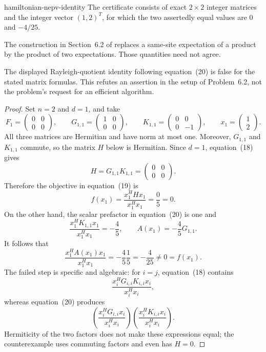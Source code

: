 \begin{cxcertificate}{hamiltonian-nepv-identity}
The certificate consists of exact $2\times2$ integer matrices and the integer
vector $(1,2)^T$, for which the two assertedly equal values are $0$ and
$-4/25$.
\end{cxcertificate}

\begin{cxrefutation}
The construction in Section~6.2 of \cite{AmselEtAl2026} replaces a same-site
expectation of a product by the product of two expectations.  Those
quantities need not agree.

\begin{theorem}
\label{thm:hamiltonian-nepv-identity}
The displayed Rayleigh-quotient identity following equation~(20) is false for
the stated matrix formulas.  This refutes an assertion in the setup of
Problem~6.2, not the problem's request for an efficient algorithm.
\end{theorem}
\begin{proof}
Set $n=2$ and $d=1$, and take
\[
F_1=\begin{pmatrix}0&0\\0&0\end{pmatrix},\qquad
G_{1,1}=\begin{pmatrix}1&0\\0&0\end{pmatrix},\qquad
K_{1,1}=\begin{pmatrix}0&0\\0&-1\end{pmatrix},\qquad
x_1=\begin{pmatrix}1\\2\end{pmatrix}.
\]
All three matrices are Hermitian and have norm at most one.  Moreover,
$G_{1,1}$ and $K_{1,1}$ commute, so the matrix $H$ below is Hermitian.  Since
$d=1$, equation~(18) gives
\[
H=G_{1,1}K_{1,1}
=\begin{pmatrix}0&0\\0&0\end{pmatrix}.
\]
Therefore the objective in equation~(19) is
\[
f(x_1)=\frac{x_1^HHx_1}{x_1^Hx_1}=\frac{0}{5}=0.
\]
On the other hand, the scalar prefactor in equation~(20) is one and
\[
\frac{x_1^HK_{1,1}x_1}{x_1^Hx_1}=-\frac45,
\qquad
A(x_1)=-\frac45G_{1,1}.
\]
It follows that
\[
\frac{x_1^HA(x_1)x_1}{x_1^Hx_1}
=-\frac45\frac{1}{5}=-\frac{4}{25}\ne0=f(x_1).
\]
The failed step is specific and algebraic: for $i=j$, equation~(18) contains
\[
\frac{x_i^HG_{i,i}K_{i,i}x_i}{x_i^Hx_i},
\]
whereas equation~(20) produces
\[
\left(\frac{x_i^HG_{i,i}x_i}{x_i^Hx_i}\right)
\left(\frac{x_i^HK_{i,i}x_i}{x_i^Hx_i}\right).
\]
Hermiticity of the two factors does not make these expressions equal; the
counterexample uses commuting factors and even has $H=0$.
\end{proof}
\end{cxrefutation}
